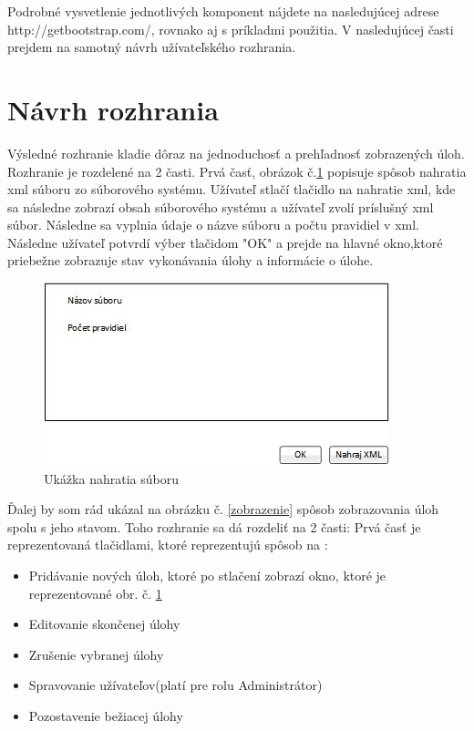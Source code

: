 Podrobné vysvetlenie jednotlivých komponent nájdete na nasledujúcej adrese http://getbootstrap.com/, rovnako aj s príkladmi použitia. V nasledujúcej časti prejdem na samotný návrh užívateľského rozhrania.

\section{Návrh rozhrania}
Výsledné rozhranie kladie dôraz na jednoduchosť a prehľadnosť zobrazených úloh. Rozhranie je rozdelené na 2 časti. Prvá časť, obrázok č.\ref{nahratie} popisuje spôsob nahratia xml súboru zo súborového systému. Užívateľ stlačí tlačidlo na nahratie xml, kde sa následne zobrazí obsah súborového systému a užívateľ zvolí príslušný xml súbor. Následne sa vyplnia údaje o názve súboru a počtu pravidiel v xml. Následne užívateľ potvrdí výber tlačidom "OK" a prejde na hlavné okno,ktoré priebežne zobrazuje stav vykonávania úlohy a informácie o úlohe.
\begin{figure}[!htb]

\begin{center}

\includegraphics[scale=0.8]{NahratieSuboru.jpg} 
\caption{Ukážka nahratia súboru}
\label{nahratie}

\end{center}

\end{figure}

Ďalej by som rád ukázal na obrázku č. \ref{zobrazenie} spôsob zobrazovania úloh spolu s jeho stavom. Toho rozhranie sa dá rozdeliť na 2 časti: Prvá časť je reprezentovaná tlačidlami, ktoré reprezentujú spôsob na : 
\begin{itemize}
\item Pridávanie nových úloh, ktoré po stlačení zobrazí okno, ktoré je reprezentované obr. č. \ref{nahratie}
\item Editovanie skončenej úlohy
\item Zrušenie vybranej úlohy
\item Spravovanie užívateľov(platí pre rolu Administrátor)
\item Pozostavenie bežiacej úlohy

\end{itemize}

